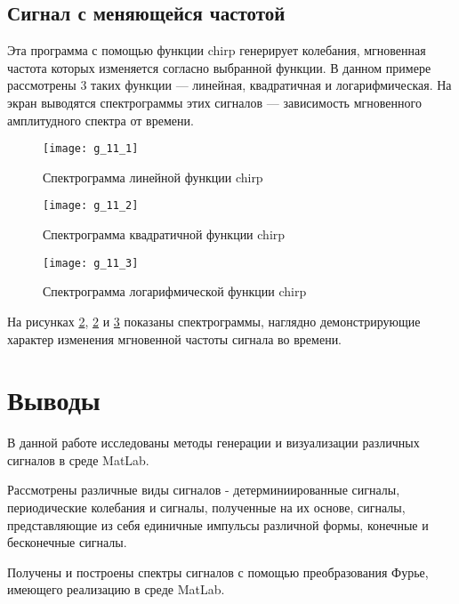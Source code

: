\subsection{Сигнал с меняющейся частотой}


\parindent=1cm
Эта программа с помощью функции chirp генерирует колебания, мгновенная частота которых изменяется согласно выбранной функции. В данном примере рассмотрены 3 таких функции — линейная, квадратичная и логарифмическая. На экран выводятся спектрограммы этих сигналов — зависимость мгновенного амплитудного спектра от времени.

\begin{figure}[H]
	\begin{center}
		\texttt{[image: g\_11\_1]}
		\caption{Спектрограмма линейной функции chirp} 
		\label{pic:g_11_1} %
	\end{center}
\end{figure}
\begin{figure}[H]
	\begin{center}
		\texttt{[image: g\_11\_2]}
		\caption{Спектрограмма квадратичной функции chirp} 
		\label{pic:g_11_2} %
	\end{center}
\end{figure}
\begin{figure}[H]
	\begin{center}
		\texttt{[image: g\_11\_3]}
		\caption{Спектрограмма логарифмической функции chirp} 
		\label{pic:g_11_3} %
	\end{center}
\end{figure}
На рисунках \ref{pic:g_11_2}, \ref{pic:g_11_2} и \ref{pic:g_11_3} показаны спектрограммы, наглядно демонстрирующие характер изменения мгновенной частоты сигнала во времени.

\section{Выводы}

В данной работе исследованы методы генерации и визуализации различных сигналов в среде MatLab. 

Рассмотрены различные виды сигналов - детерминиированные сигналы, периодические колебания и сигналы, полученные на их основе, сигналы, представляющие из себя единичные импульсы различной формы, конечные и бесконечные сигналы.

Получены и построены спектры сигналов с помощью преобразования Фурье, имеющего реализацию в среде MatLab.


